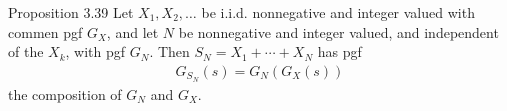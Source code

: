 %
%
%
%
\begin{boks}{Proposition 3.39}
  Let $X_1, X_2, \ldots$ be i.i.d. nonnegative and integer valued with commen pgf $G_X$, and let $N$ be nonnegative and integer valued, and independent of the $X_k$, with pgf $G_N$. Then $S_N = X_1 + \cdots + X_N$ has pgf
  \begin{align*}
    G_{S_N}(s) = G_N(G_X(s))
  \end{align*}
  the composition of $G_N$ and $G_X$.
\end{boks}

